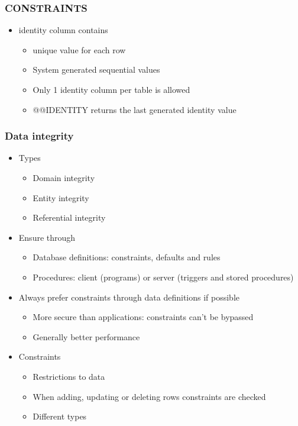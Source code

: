 \documentclass{report}
\begin{document}
    \subsubsection{CONSTRAINTS}
    \begin{itemize}
        \item identity column contains
        \begin{itemize}
            \item unique value for each row
            \item System generated sequential values
            \item Only 1 identity column per table is allowed
            \item @@IDENTITY returns the last generated identity value
        \end{itemize}
    \end{itemize}

    \subsubsection{Data integrity}
    \begin{itemize}
        \item Types
        \begin{itemize}
            \item Domain integrity
            \item Entity integrity
            \item Referential integrity
        \end{itemize}
        \item Ensure through
        \begin{itemize}
            \item Database definitions: constraints, defaults and rules
            \item Procedures: client (programs) or server (triggers and stored procedures)
        \end{itemize}
        \item Always prefer constraints through data definitions if possible
        \begin{itemize}
            \item More secure than applications: constraints can't be bypassed
            \item Generally better performance
        \end{itemize}
        \item Constraints
            \begin{itemize}
                \item Restrictions to data
                \item When adding, updating or deleting rows constraints are checked
                \item Different types
            \end{itemize}
    \end{itemize}
    
\end{document}
